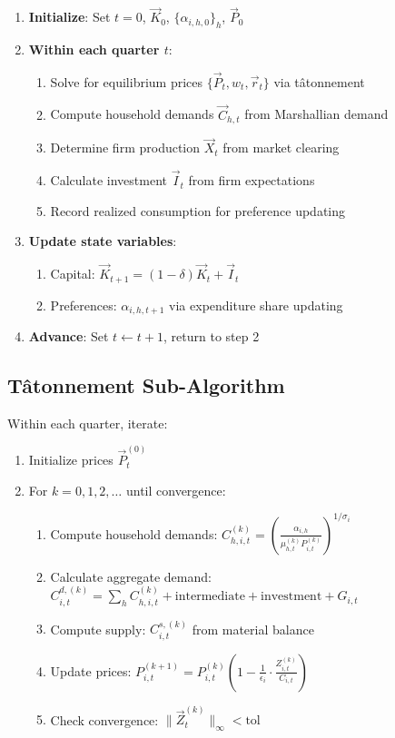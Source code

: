 \documentclass[12pt,a4paper]{article}
\theoremstyle{definition}
\theoremstyle{remark}
\begin{document}
\begin{enumerate}
    \item \textbf{Initialize}: Set $t = 0$, $\vec{K}_0$, $\{\alpha_{i,h,0}\}_h$, $\vec{P}_0$
    \item \textbf{Within each quarter $t$}:
    \begin{enumerate}[label=(\alph*)]
        \item Solve for equilibrium prices $\{\vec{P}_t, w_t, \vec{r}_t\}$ via tâtonnement
        \item Compute household demands $\vec{C}_{h,t}$ from Marshallian demand
        \item Determine firm production $\vec{X}_t$ from market clearing
        \item Calculate investment $\vec{I}_t$ from firm expectations
        \item Record realized consumption for preference updating
    \end{enumerate}
    \item \textbf{Update state variables}:
    \begin{enumerate}[label=(\alph*)]
        \item Capital: $\vec{K}_{t+1} = (1-\delta)\vec{K}_t + \vec{I}_t$
        \item Preferences: $\alpha_{i,h,t+1}$ via expenditure share updating
    \end{enumerate}
    \item \textbf{Advance}: Set $t \leftarrow t+1$, return to step 2
\end{enumerate}

\subsection{Tâtonnement Sub-Algorithm}

Within each quarter, iterate:

\begin{enumerate}
    \item Initialize prices $\vec{P}_t^{(0)}$
    \item For $k = 0, 1, 2, \ldots$ until convergence:
    \begin{enumerate}[label=(\alph*)]
        \item Compute household demands: $C_{h,i,t}^{(k)} = \left(\frac{\alpha_{i,h}}{\mu_{h,t}^{(k)} P_{i,t}^{(k)}}\right)^{1/\sigma_i}$
        \item Calculate aggregate demand: $C_{i,t}^{d,(k)} = \sum_h C_{h,i,t}^{(k)} + \text{intermediate} + \text{investment} + G_{i,t}$
        \item Compute supply: $C_{i,t}^{s,(k)}$ from material balance
        \item Update prices: $P_{i,t}^{(k+1)} = P_{i,t}^{(k)} \left(1 - \frac{1}{\epsilon_i} \cdot \frac{Z_{i,t}^{(k)}}{C_{i,t}}\right)$
        \item Check convergence: $\|\vec{Z}_t^{(k)}\|_\infty < \text{tol}$
    \end{enumerate}
\end{enumerate}
\end{document}
